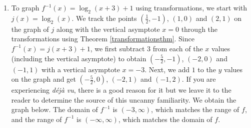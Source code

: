 {\begin{enumerate}
\begin{enumerate}
\item put as an exponent on $2$

\item subtract $3$

\end{enumerate}

Clearly, to undo subtracting $1$, we will add $1$, and similarly we undo subtracting $3$ by adding $3$.  How do we undo the second step?  The answer is we use the logarithm.  By definition, $\log_{2}(x)$ undoes exponentiation by $2$.  Hence, $f^{-1}$ should

\begin{enumerate}

\item add $3$

\item take the logarithm base $2$

\item add $1$

\end{enumerate}

In symbols, $f^{-1}(x) = \log_{2}(x+3)+1$.  


\item  To graph $f^{-1}(x) = \log_{2}(x+3)+1$ using transformations, we start with $j(x) = \log_{2}(x)$.  We track the points $\left(\frac{1}{2},-1\right)$, $(1,0)$ and $(2, 1)$ on the graph of $j$ along with the vertical asymptote $x=0$ through the transformations using Theorem \ref{transformationsthm}.  Since $f^{-1}(x) = j(x+3)+1$, we first subtract $3$ from each of the $x$ values (including the vertical asymptote) to obtain  $\left(-\frac{5}{2},-1\right)$, $(-2,0)$ and $(-1, 1)$ with a vertical asymptote $x = -3$.  Next, we add $1$ to the $y$ values on the graph and get $\left(-\frac{5}{2},0\right)$, $(-2,1)$ and $(-1, 2)$.  If you are experiencing \textit{d\'{e}j\`{a} vu}, there is a good reason for it but we leave it to the reader to determine the source of this uncanny familiarity.  We obtain the graph below.  The domain of $f^{-1}$ is $(-3, \infty)$, which matches the range of $f$, and the range of $f^{-1}$ is $(-\infty, \infty)$, which matches the domain of $f$.




\end{enumerate}}
